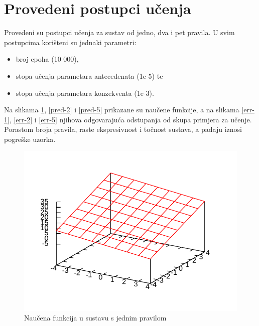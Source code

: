 \documentclass{article}
\begin{document}
\section{Provedeni postupci učenja}

Provedeni su postupci učenja za sustav od jedno, dva i pet pravila.
U svim postupcima korišteni su jednaki parametri:
\begin{itemize}
    \item broj epoha (10 000),
    \item stopa učenja parametara antecedenata (1e-5) te
    \item stopa učenja parametara konzekventa (1e-3).
\end{itemize}

Na slikama \ref{pred-1}, \ref{pred-2} i \ref{pred-5}
prikazane su naučene funkcije,
a na slikama \ref{err-1}, \ref{err-2} i \ref{err-5}
njihova odgovarajuća odstupanja od skupa primjera za učenje.
Porastom broja pravila, raste ekspresivnost i točnost sustava,
a padaju iznosi pogreške uzorka.

\begin{figure}[h]
    \centering
    \includegraphics{img/prediction-batch-1.pdf}
    \caption{Naučena funkcija u sustavu s jednim pravilom}
    \label{pred-1}
\end{figure}
\end{document}
